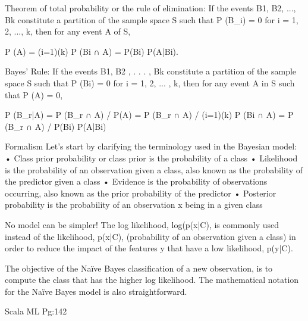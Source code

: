 Theorem of total probability or the rule of elimination:
If the events B1, B2, ..., Bk constitute a partition of the sample space S such that
P (B_i) = 0 for i = 1, 2, ..., k, then for any event A of S,

P (A) = \sum(i=1)(k) P (Bi ∩ A) =  P(Bi) P(A|Bi).

Bayes’ Rule:
If the events B1, B2 , . . . , Bk constitute a partition of the sample
space S such that P (Bi) = 0 for i = 1, 2, ... , k, then for any event A in S such
that P (A) = 0,

P (B_r|A) = P (B_r ∩ A) / P(A)
          = P (B_r ∩ A) / \sum(i=1)(k) P (Bi ∩ A)
          = P (B_r ∩ A) /  P(Bi) P(A|Bi)


Formalism
Let's start by clarifying the terminology used in the Bayesian model:
•	 Class prior probability or class prior is the probability of a class
•	 Likelihood is the probability of an observation given a class, also known as
the probability of the predictor given a class
•	 Evidence is the probability of observations occurring, also known as the
prior probability of the predictor
•	 Posterior probability is the probability of an observation x being in a
given class

No model can be simpler! The log likelihood, log(p(x|C), is commonly used instead
of the likelihood, p(x|C), (probability of an observation given a class) in order to
reduce the impact of the features y that have a low likelihood, p(y|C).

The objective of the Naïve Bayes classification of a new observation, is to compute
the class that has the higher log likelihood. The mathematical notation for the Naïve
Bayes model is also straightforward.

Scala ML Pg:142